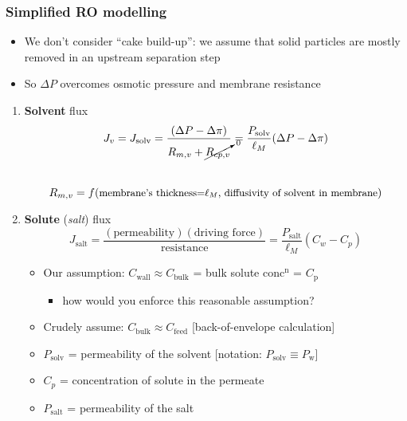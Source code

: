 \begin{frame}\frametitle{Simplified RO modelling}
	\begin{itemize}
		\item	We don't consider ``cake build-up'': we assume that solid particles are mostly removed in an upstream separation step
		\item	So $\Delta P$ overcomes osmotic pressure and membrane resistance
	\end{itemize}
	\vspace{-6pt}
	\begin{enumerate}
		\item	\textbf{Solvent} flux
			\[	J_v = J_\text{solv} = \frac{(\Delta P - \Delta \pi)}{R_{m,v} + \cancelto{0}{R_{cp,v}}} = \frac{P_\text{solv}}{\ell_M}(\Delta P - \Delta \pi) \] \\
			\[	R_{m,v} = f(\text{\small membrane's thickness=$\ell_M$, diffusivity of solvent in membrane})\]
		\item	\textbf{Solute} (\emph{salt}) flux
			\[
				J_\text{salt} = \displaystyle \frac{(\text{permeability})(\text{driving force})}{\text{resistance}} = \displaystyle \frac{P_\text{salt}}{\ell_M} \left(C_w - C_p\right)
			\]
			\begin{itemize}
				\item	Our assumption: $C_\text{wall} \approx C_\text{bulk}$ = bulk solute conc$^\text{n}$ = $C_\text{p}$
				\begin{itemize}
					\item	how would you enforce this reasonable assumption?
				\end{itemize}
				\item	Crudely assume: $C_\text{bulk}  \approx C_\text{feed}$ [back-of-envelope calculation]
				\item	$P_\text{solv}$ = permeability of the solvent [notation: $P_\text{solv} \equiv P_\text{w}$]
				\item	$C_p$ = concentration of solute in the permeate
				\item	$P_\text{salt}$ = permeability of the salt
			\end{itemize}			
	\end{enumerate}
\end{frame}

